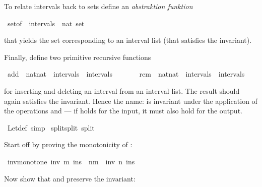 \begin{isabellebody}
\begin{isamarkuptext}
To relate intervals back to sets define an \emph{abstraktion funktion}%
\end{isamarkuptext}%
\isamarkuptrue%
\ set{\isacharunderscore}of\ {\isacharcolon}{\isacharcolon}\ {\isachardoublequote}intervals\ {\isacharequal}{\isachargreater}\ nat\ set{\isachardoublequote}\isamarkupfalse%
%
\begin{isamarkuptext}%
that yields the set corresponding to an interval list (that
satisfies the invariant).

Finally, define two primitive recursive functions%
\end{isamarkuptext}%
\isamarkuptrue%
\ add\ {\isacharcolon}{\isacharcolon}\ {\isachardoublequote}{\isacharparenleft}nat{\isacharasterisk}nat{\isacharparenright}\ {\isacharequal}{\isachargreater}\ intervals\ {\isacharequal}{\isachargreater}\ intervals{\isachardoublequote}\isanewline
\ \ \ \ \ \ \ rem\ {\isacharcolon}{\isacharcolon}\ {\isachardoublequote}{\isacharparenleft}nat{\isacharasterisk}nat{\isacharparenright}\ {\isacharequal}{\isachargreater}\ intervals\ {\isacharequal}{\isachargreater}\ intervals{\isachardoublequote}\isamarkupfalse%
%
\begin{isamarkuptext}%
for inserting and deleting an interval from an interval
list. The result should again satisfies the invariant. Hence the name:
 is invariant under the application of the operations
 and  --- if  holds for the input, it
must also hold for the output.%
\end{isamarkuptext}%
\isamarkuptrue%
%
\isamarkuptrue%
\ Let{\isacharunderscore}def\ {\isacharbrackleft}simp{\isacharbrackright}\isanewline
\isamarkupfalse%
\ split{\isacharunderscore}split\ {\isacharbrackleft}split{\isacharbrackright}\isamarkupfalse%
%
\begin{isamarkuptext}%
Start off by proving the monotonicity of :%
\end{isamarkuptext}%
\isamarkuptrue%
\ inv{}{\isacharunderscore}monotone{\isacharcolon}\ {\isachardoublequote}inv{}\ m\ ins\ {\isasymLongrightarrow}\ n{\isasymle}m\ {\isasymLongrightarrow}\ inv{}\ n\ ins{\isachardoublequote}\isamarkupfalse%
\isamarkupfalse%
%
\begin{isamarkuptext}%
Now show that  and  preserve the invariant:%
\end{isamarkuptext}%
\isamarkuptrue%

\end{isabellebody}
